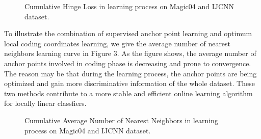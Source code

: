 \documentclass{llncs}
\begin{document}
	\begin{figure}[!tbp]
		\centering
		\hfill
		\caption{Cumulative Hinge Loss in learning process on Magic04 and IJCNN dataset.}
	\end{figure}

	To illustrate the combination of supervised anchor point learning and optimum local coding coordinates learning, we give the average number of nearest neighbors learning curve in Figure 3. As the figure shows, the average number of anchor points involved in coding phase is decreasing and prone to convergence. The reason may be that during the learning process, the anchor points are being optimized and gain more discriminative information of the whole dataset. These two methods contribute to a more stable and efficient online learning algorithm for locally linear classfiers.
	\begin{figure}[!tbp]
		\centering
		\hfill
		\caption{Cumulative Average Number of Nearest Neighbors in learning process on Magic04 and IJCNN dataset.}
	\end{figure}
\end{document}
